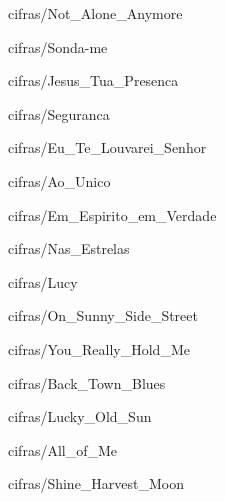 \documentclass{scrartcl}
\begin{document}

{cifras/Not_Alone_Anymore}


{cifras/Sonda-me}


{cifras/Jesus_Tua_Presenca}


{cifras/Seguranca}


{cifras/Eu_Te_Louvarei_Senhor}


{cifras/Ao_Unico}


{cifras/Em_Espirito_em_Verdade}


{cifras/Nas_Estrelas}


{cifras/Lucy}


{cifras/On_Sunny_Side_Street}


{cifras/You_Really_Hold_Me}


{cifras/Back_Town_Blues}


{cifras/Lucky_Old_Sun}


{cifras/All_of_Me}


{cifras/Shine_Harvest_Moon}
\end{document}
